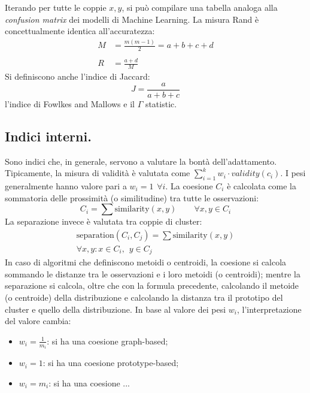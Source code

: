 \documentclass[11pt, a4page, twocolumn]{article}
\begin{document}
Iterando per tutte le coppie $x, y$, si può compilare una tabella analoga alla \textit{confusion matrix} dei modelli di Machine Learning.
La misura Rand è concettualmente identica all'accuratezza:
\begin{align*}
  M &= \frac{m(m-1)}{2} = a + b + c + d \\ \\
  R &= \frac{a+d}{M}
\end{align*}
Si definiscono anche l'indice di Jaccard:
\begin{equation*}
  J = \frac{a}{a + b + c}
\end{equation*}
l'indice di Fowlkes and Mallows e il $\Gamma$ statistic.

\subsection{Indici interni.}
Sono indici che, in generale, servono a valutare la bontà dell'adattamento.
Tipicamente, la misura di validità è valutata come $\sum_{i=1}^{k}{w_i \cdot validity(c_i)}$.
I pesi generalmente hanno valore pari a $w_i = 1 \hspace{5pt} \forall{i}$.
La coesione $C_i$ è calcolata come la sommatoria delle prossimità (o similitudine) tra tutte le osservazioni:
\begin{equation*}
  C_i = \sum{\text{similarity}(x, y)} \hspace{25pt} \forall{x, y \in C_i}
\end{equation*}
La separazione invece è valutata tra coppie di cluster:
\begin{align*}
  \text{separation}(C_i, C_j) = \sum{\text{similarity}(x, y)} \\
  \forall x, y : x \in C_i, \hspace{5pt} y \in C_j
\end{align*}
In caso di algoritmi che definiscono metoidi o centroidi, la coesione si calcola sommando le distanze tra le osservazioni e i loro metoidi (o centroidi); mentre la separazione si calcola, oltre che con la formula precedente, calcolando il metoide (o centroide) della distribuzione e calcolando la distanza tra il prototipo del cluster e quello della distribuzione.
In base al valore dei pesi $w_i$, l'interpretazione del valore cambia:
\begin{itemize}
\item $w_i = \frac{1}{m_i}$: si ha una coesione graph-based;
\item $w_i = 1$: si ha una coesione prototype-based;
\item $w_i = m_i$: si ha una coesione ...
\end{itemize}
\end{document}
